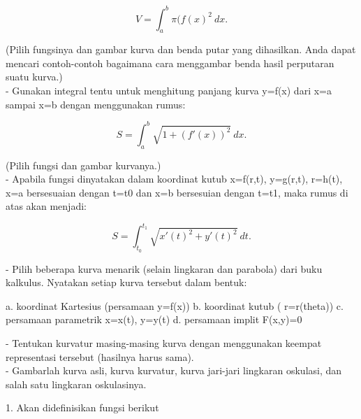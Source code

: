 \documentclass{article}
\begin{document}
\begin{eulernotebook}
\begin{eulercomment}
\begin{eulercomment}
\begin{eulercomment}
\begin{eulercomment}
\begin{eulercomment}
\begin{eulercomment}
\begin{eulercomment}
\begin{eulercomment}
\begin{eulercomment}
\end{eulercomment}
\begin{eulerformula}
\[
V = \int_a^b \pi (f(x)^2\ dx.
\]
\end{eulerformula}
\begin{eulercomment}
(Pilih fungsinya dan gambar kurva dan benda putar yang dihasilkan.
Anda dapat mencari contoh-contoh bagaimana cara menggambar benda hasil
perputaran suatu kurva.)\\
- Gunakan integral tentu untuk menghitung panjang kurva y=f(x) dari
x=a sampai x=b dengan menggunakan rumus:

\end{eulercomment}
\begin{eulerformula}
\[
S = \int_a^b \sqrt{1+(f'(x))^2} \ dx.
\]
\end{eulerformula}
\begin{eulercomment}
(Pilih fungsi dan gambar kurvanya.)\\
- Apabila fungsi dinyatakan dalam koordinat kutub x=f(r,t), y=g(r,t),
r=h(t), x=a bersesuaian dengan t=t0 dan x=b bersesuian dengan t=t1,
maka rumus di atas akan menjadi:

\end{eulercomment}
\begin{eulerformula}
\[
S=\int_{t_0}^{t_1} \sqrt{x'(t)^2+y'(t)^2}\ dt.
\]
\end{eulerformula}
\begin{eulercomment}
- Pilih beberapa kurva menarik (selain lingkaran dan parabola) dari
buku  kalkulus. Nyatakan setiap kurva tersebut dalam bentuk:\\
\end{eulercomment}
\begin{eulerttcomment}
  a. koordinat Kartesius (persamaan y=f(x))
  b. koordinat kutub ( r=r(theta))
  c. persamaan parametrik x=x(t), y=y(t)
  d. persamaan implit F(x,y)=0
\end{eulerttcomment}
\begin{eulercomment}
- Tentukan kurvatur masing-masing kurva dengan menggunakan keempat
representasi tersebut (hasilnya harus sama).\\
- Gambarlah kurva asli, kurva kurvatur, kurva jari-jari lingkaran
oskulasi, dan salah satu lingkaran oskulasinya.
\end{eulercomment}
\begin{eulercomment}


1. Akan didefinisikan fungsi berikut


\end{eulercomment}
\end{eulercomment}
\end{eulercomment}
\end{eulercomment}
\end{eulercomment}
\end{eulercomment}
\end{eulercomment}
\end{eulercomment}
\end{eulercomment}
\end{eulernotebook}
\end{document}
